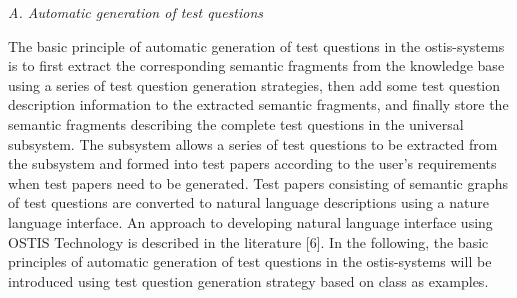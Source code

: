 \documentclass{article}
\begin{document}
\begin{multicols}{2}
\textit{A. Automatic generation of test questions}

The basic principle of automatic generation of test
questions in the ostis-systems is to first extract the
corresponding semantic fragments from the knowledge
base using a series of test question generation strategies,
then add some test question description information to
the extracted semantic fragments, and finally store the
semantic fragments describing the complete test questions
in the universal subsystem. The subsystem allows a series
of test questions to be extracted from the subsystem
and formed into test papers according to the user’s
requirements when test papers need to be generated. Test
papers consisting of semantic graphs of test questions
are converted to natural language descriptions using a
nature language interface. An approach to developing
natural language interface using OSTIS Technology is
described in the literature [6]. In the following, the basic
principles of automatic generation of test questions in
the ostis-systems will be introduced using test question
generation strategy based on class as examples.

\end{multicols}
\end{document}
